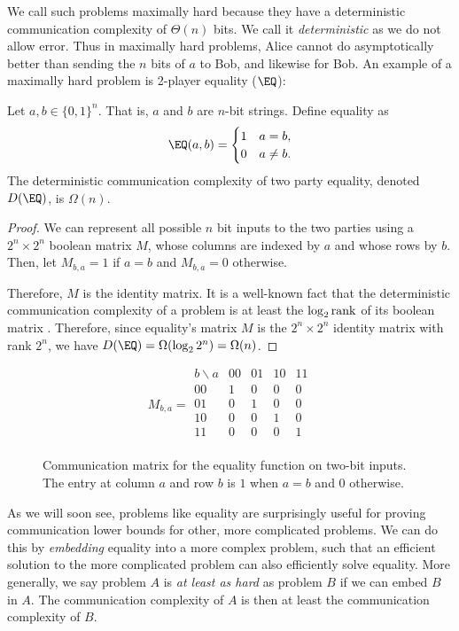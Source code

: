 We call such problems maximally hard because they have a deterministic communication complexity of $\Theta (n)$ bits. We call it \textit{deterministic} as we do not allow error. Thus in maximally hard problems, Alice cannot do asymptotically better than sending the $n$ bits of $a$ to Bob, and likewise for Bob. An example of a maximally hard problem is 2-player equality ($\EQ$):

\begin{claim} 
Let $a, b \in \{0,1\}^n$. That is, $a$ and $b$ are $n$-bit strings. Define equality as 
\begin{align}
    \EQ(a,b) = \begin{cases}
        1 & a = b, \\
        0 & a \neq b.
    \end{cases}
\end{align}
The deterministic communication complexity of two party equality, denoted $D(\EQ)$, is $\Omega(n)$.
\end{claim}

\begin{proof}
We can represent all possible $n$ bit inputs to the two parties using a $2^n \times 2^n$ boolean matrix $M$, whose columns are indexed by $a$ and whose rows by $b$. Then, let $M_{b,a} = 1$ if $a = b$ and $M_{b,a} = 0$ otherwise.

Therefore, $M$ is the identity matrix. It is a well-known fact that the deterministic communication complexity of a problem is at least the $\log_2 \operatorname{rank}$ of its boolean matrix \parencite{RaoYehudayoffBook}. Therefore, since equality's matrix $M$ is the $2^n \times 2^n$ identity matrix with rank $2^n$, we have $D(\EQ) = \Omega(\log_2 2^n) = \Omega(n)$.
\end{proof}
\begin{figure}[H]
\centering
\[
M_{b,a} =
\begin{array}{c|cccc}
b \backslash a & 00 & 01 & 10 & 11 \\
\hline
00 & 1 & 0 & 0 & 0 \\
01 & 0 & 1 & 0 & 0 \\
10 & 0 & 0 & 1 & 0 \\
11 & 0 & 0 & 0 & 1 \\
\end{array}
\]
\caption{Communication matrix for the equality function on two-bit inputs. The entry at column $a$ and row $b$ is $1$ when $a=b$ and $0$ otherwise.}
\end{figure}
    
As we will soon see, problems like equality are surprisingly useful for proving communication lower bounds for other, more complicated problems. We can do this by \textit{embedding} equality into a more complex problem, such that an efficient solution to the more complicated problem can also efficiently solve equality. More generally, we say problem $A$ is \textit{at least as hard} as problem $B$ if we can embed $B$ in $A$. The communication complexity of $A$ is then at least the communication complexity of $B$.

